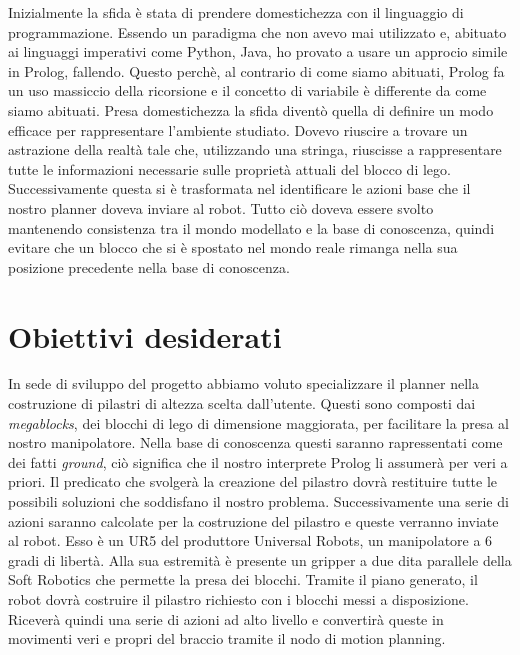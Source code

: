 Inizialmente la sfida è stata di prendere domestichezza con il linguaggio di programmazione.
Essendo un paradigma che non avevo mai utilizzato e, abituato ai linguaggi imperativi come Python, Java, ho provato a usare un approcio simile
in Prolog, fallendo. Questo perchè, al contrario di come siamo abituati, Prolog fa un uso massiccio della ricorsione e il concetto di variabile è differente da come siamo abituati. 
Presa domestichezza la sfida diventò quella di definire un modo efficace per rappresentare l'ambiente studiato.
Dovevo riuscire a trovare un astrazione della realtà tale che, utilizzando una stringa, riuscisse a rappresentare tutte le informazioni necessarie sulle proprietà
attuali del blocco di lego. Successivamente questa si è trasformata nel identificare le azioni base che il nostro planner doveva inviare al robot.
Tutto ciò doveva essere svolto mantenendo consistenza tra il mondo modellato e la base di conoscenza, quindi evitare che un blocco che si è spostato
nel mondo reale rimanga nella sua posizione precedente nella base di conoscenza. 

\section{Obiettivi desiderati}
\label{sec:obiettdes}
In sede di sviluppo del progetto abbiamo voluto specializzare il planner nella costruzione di pilastri di altezza scelta dall'utente. Questi sono 
composti dai \textit{megablocks}, dei blocchi di lego di dimensione maggiorata, per facilitare la presa al nostro manipolatore. Nella base di conoscenza questi saranno rapressentati come dei fatti \textit{ground}, ciò significa che il nostro 
interprete Prolog li assumerà per veri a priori. Il predicato che svolgerà la creazione del pilastro dovrà restituire tutte le possibili soluzioni che
soddisfano il nostro problema. Successivamente una serie di azioni saranno calcolate per la costruzione del pilastro e queste verranno inviate al robot. Esso è un UR5
del produttore Universal Robots, un manipolatore a 6 gradi di libertà. Alla sua estremità è presente un gripper a due dita parallele della Soft Robotics che permette la presa dei blocchi.
Tramite il piano generato, il robot dovrà costruire il pilastro richiesto con i blocchi messi a disposizione. Riceverà quindi una serie di azioni ad alto
livello e convertirà queste in movimenti veri e propri del braccio tramite il nodo di motion planning.

